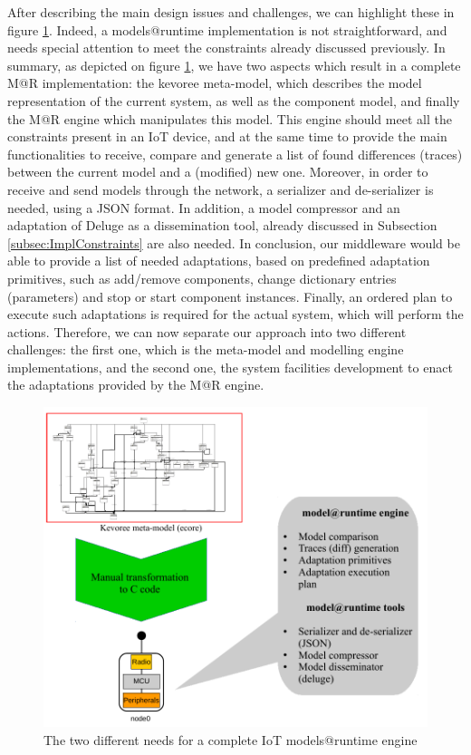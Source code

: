 After describing the main design issues and challenges, we can highlight these in figure \ref{fig:MAR_Challenges}.
Indeed, a models@runtime implementation is not straightforward, and needs special attention to meet the constraints already discussed previously.
In summary, as depicted on figure \ref{fig:MAR_Challenges}, we have two aspects which result in a complete M@R implementation: the kevoree meta-model, which describes the model representation of the current system, as well as the component model, and finally the M@R engine which manipulates this model.
This engine should meet all the constraints present in an IoT device, and at the same time to provide the main functionalities to receive, compare and generate a list of found differences (traces) between the current model and a (modified) new one.
Moreover, in order to receive and send models through the network, a serializer and de-serializer is needed, using a JSON format.
In addition, a model compressor and an adaptation of Deluge \cite{hui2004dynamic} as a dissemination tool, already discussed in Subsection \ref{subsec:ImplConstraints} are also needed.
In conclusion, our middleware would be able to provide a list of needed adaptations, based on predefined adaptation primitives, such as add/remove components, change dictionary entries (parameters) and stop or start component instances.
Finally, an ordered plan to execute such adaptations is required for the actual system, which will perform the actions.
Therefore, we can now separate our approach into two different challenges: the first one, which is the meta-model and modelling engine implementations, and the second one, the system facilities development to enact the adaptations provided by the M@R engine.

\begin{figure}[]
	\centering
	\includegraphics[width=0.85\columnwidth]{chapters/modelsAtRuntimeContiki.images/Challenges.pdf}
	\caption{The two different needs for a complete IoT models@runtime engine}
	\label{fig:MAR_Challenges}
\end{figure}

